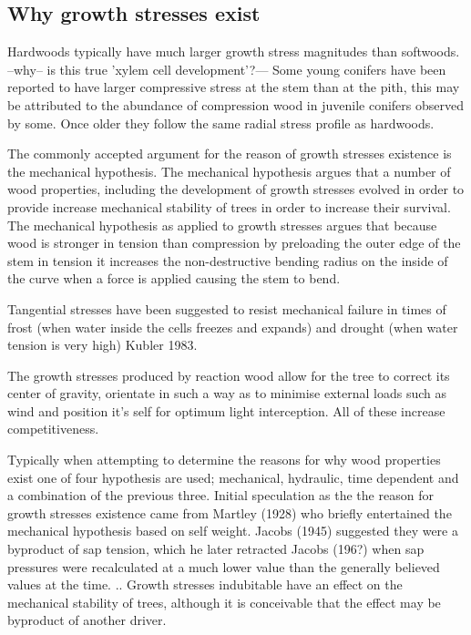 \documentclass{article}
\begin{document}
\subsection{Why growth stresses exist}
Hardwoods typically have much larger growth stress magnitudes than softwoods.
--why-- is this true 'xylem cell development'?--- Some young conifers have been
reported to have larger compressive stress at the stem than at the pith,
this may be attributed to the abundance of compression wood in juvenile
conifers observed by some. Once older they follow the same radial stress profile
as hardwoods.

The commonly accepted argument for the reason of growth stresses existence is
the mechanical hypothesis. The mechanical hypothesis argues that a number of wood
properties, including the development of growth stresses evolved in order to
provide increase mechanical stability of trees in order to increase their
survival. The mechanical hypothesis as applied to growth stresses argues that
because wood is stronger in tension than compression by preloading the outer
edge of the stem in tension it increases the non-destructive bending radius on
the inside of the curve when a force is applied causing the stem to bend.

Tangential stresses have been suggested to resist mechanical failure in times of
frost (when water inside the cells freezes and expands) and drought (when water
tension is very high) Kubler 1983.

The growth stresses produced by reaction wood allow for the tree to correct its
center of gravity, orientate in such a way as to minimise external loads such as
wind and position it's self for optimum light interception. All of these
increase competitiveness.

Typically when attempting to determine the reasons for why wood properties exist
one of four hypothesis are used; mechanical, hydraulic, time dependent and a
combination of the previous three. Initial speculation as the the reason for
growth stresses existence came from Martley (1928) who briefly entertained the
mechanical hypothesis based on self weight. Jacobs (1945) suggested they were a
byproduct of sap tension, which he later retracted Jacobs (196?) when sap
pressures were recalculated at a much lower value than the generally believed
values at the time. .. Growth stresses indubitable have an effect on the
mechanical stability of trees, although it is conceivable that the effect may be
byproduct of another driver.
\end{document}
